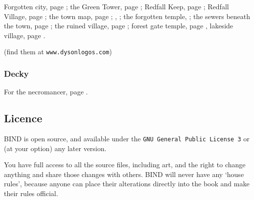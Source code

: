 \begin{multicols}{2}
Forgotten city, page \pageref{Dyson_Logos/forgotten_city};
the Green Tower, page \pageref{Dyson_Logos/green_tower};
Redfall Keep, page \pageref{Dyson_Logos/redfall_keep};
Redfall Village, page \pageref{Dyson_Logos/redfall};
the town map, page \pageref{Dyson_Logos/town};
, \pageref{Dyson_Logos/mincing_pig};
the forgotten temple, \pageref{Dyson_Logos/qualme_temple};
the sewers beneath the town, page \pageref{Dyson_Logos/sewer};
the ruined village, page \pageref{Dyson_Logos/ruined_village};
forest gate temple, page \pageref{Dyson_Logos/shadow_gate},
lakeside village, page \pageref{Dyson_Logos/lakeside}.

(find them at {\tt www.dysonlogos.com})

\subsubsection{Decky}

For the necromancer, page \pageref{Decky/necromancer}.

\subsection*{Licence}

BIND is open source, and available under the {\tt GNU General Public License 3} or (at your option) any later version.

You have full access to all the source files, including art, and the right to change anything and share those changes with others.
BIND will never have any `house rules', because anyone can place their alterations directly into the book and make their rules official.

\end{multicols}
